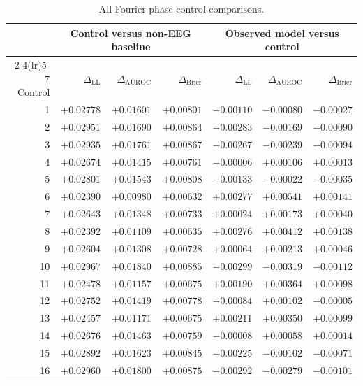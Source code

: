 \begin{table}[!htbp]
\centering\small
\caption{All Fourier-phase control comparisons.}\label{tab:phase}
\setlength{\tabcolsep}{4pt}
\begin{tabular}{r rrr rrr}
\toprule
& \multicolumn{3}{c}{Control versus non-EEG baseline} & \multicolumn{3}{c}{Observed model versus control}\\
\cmidrule(lr){2-4}\cmidrule(lr){5-7}
Control & $\Delta_{\mathrm{LL}}$ & $\Delta_{\mathrm{AUROC}}$ & $\Delta_{\mathrm{Brier}}$ & $\Delta_{\mathrm{LL}}$ & $\Delta_{\mathrm{AUROC}}$ & $\Delta_{\mathrm{Brier}}$\\\midrule
1 & $+0.02778$ & $+0.01601$ & $+0.00801$ & $-0.00110$ & $-0.00080$ & $-0.00027$\\
2 & $+0.02951$ & $+0.01690$ & $+0.00864$ & $-0.00283$ & $-0.00169$ & $-0.00090$\\
3 & $+0.02935$ & $+0.01761$ & $+0.00867$ & $-0.00267$ & $-0.00239$ & $-0.00094$\\
4 & $+0.02674$ & $+0.01415$ & $+0.00761$ & $-0.00006$ & $+0.00106$ & $+0.00013$\\
5 & $+0.02801$ & $+0.01543$ & $+0.00808$ & $-0.00133$ & $-0.00022$ & $-0.00035$\\
6 & $+0.02390$ & $+0.00980$ & $+0.00632$ & $+0.00277$ & $+0.00541$ & $+0.00141$\\
7 & $+0.02643$ & $+0.01348$ & $+0.00733$ & $+0.00024$ & $+0.00173$ & $+0.00040$\\
8 & $+0.02392$ & $+0.01109$ & $+0.00635$ & $+0.00276$ & $+0.00412$ & $+0.00138$\\
9 & $+0.02604$ & $+0.01308$ & $+0.00728$ & $+0.00064$ & $+0.00213$ & $+0.00046$\\
10 & $+0.02967$ & $+0.01840$ & $+0.00885$ & $-0.00299$ & $-0.00319$ & $-0.00112$\\
11 & $+0.02478$ & $+0.01157$ & $+0.00675$ & $+0.00190$ & $+0.00364$ & $+0.00098$\\
12 & $+0.02752$ & $+0.01419$ & $+0.00778$ & $-0.00084$ & $+0.00102$ & $-0.00005$\\
13 & $+0.02457$ & $+0.01171$ & $+0.00675$ & $+0.00211$ & $+0.00350$ & $+0.00099$\\
14 & $+0.02676$ & $+0.01463$ & $+0.00759$ & $-0.00008$ & $+0.00058$ & $+0.00014$\\
15 & $+0.02892$ & $+0.01623$ & $+0.00845$ & $-0.00225$ & $-0.00102$ & $-0.00071$\\
16 & $+0.02960$ & $+0.01800$ & $+0.00875$ & $-0.00292$ & $-0.00279$ & $-0.00101$\\

\end{tabular}
\end{table}
